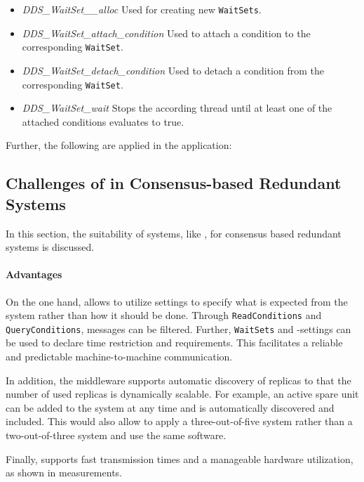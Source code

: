 \begin{itemize}
\item \textit{DDS\_WaitSet\_\_alloc} Used for creating new \texttt{WaitSets}.
\item \textit{DDS\_WaitSet\_attach\_condition} Used to attach a condition to the corresponding \texttt{WaitSet}.
\item \textit{DDS\_WaitSet\_detach\_condition} Used to detach a condition from the corresponding \texttt{WaitSet}.
\item \textit{DDS\_WaitSet\_wait} Stops the according thread until at least one of the attached conditions evaluates to true.
\end{itemize}

Further, the following  are applied in the application:

\subsection{Challenges of  in Consensus-based Redundant Systems}
In this section, the suitability of  systems, like , for consensus based redundant systems is discussed.

\paragraph{Advantages}
On the one hand,  allows to utilize  settings to specify what is expected from the system rather than how it should be done.
Through \texttt{ReadConditions} and \texttt{QueryConditions}, messages can be filtered.
Further, \texttt{WaitSets} and -settings can be used to declare time restriction and requirements.
This facilitates a reliable and predictable machine-to-machine communication.

In addition, the middleware supports automatic discovery of replicas to that the number of used replicas is dynamically scalable.
For example, an active spare unit can be added to the system at any time and is automatically discovered and included.
This would also allow to apply a three-out-of-five system rather than a two-out-of-three system and use the same software.

Finally,  supports fast transmission times and a manageable hardware utilization, as shown in measurements.


